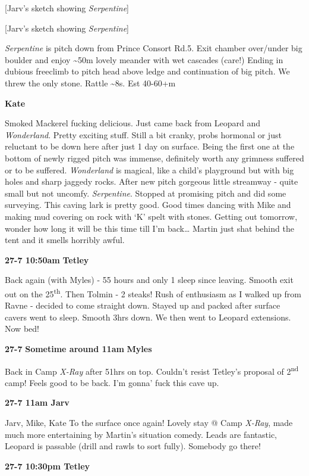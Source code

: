 {[}Jarv's sketch showing \emph{Serpentine}{]}

{[}Jarv's sketch showing \emph{Serpentine}{]}

\emph{Serpentine} is pitch down from Prince Consort Rd.5. Exit chamber
over/under big boulder and enjoy \textasciitilde{}50m lovely meander
with wet cascades (care!) Ending in dubious freeclimb to pitch head
above ledge and continuation of big pitch. We threw the only stone.
Rattle \textasciitilde{}8s. Est 40-60+m

\textbf{Kate}

Smoked Mackerel fucking delicious. Just came back from Leopard and
\emph{Wonderland}. Pretty exciting stuff. Still a bit cranky, probs
hormonal or just reluctant to be down here after just 1 day on surface.
Being the first one at the bottom of newly rigged pitch was immense,
definitely worth any grimness suffered or to be suffered.
\emph{Wonderland} is magical, like a child's playground but with big
holes and sharp jaggedy rocks. After new pitch gorgeous little streamway
- quite small but not uncomfy. \emph{Serpentine}. Stopped at promising
pitch and did some surveying. This caving lark is pretty good. Good
times dancing with Mike and making mud covering on rock with `K' spelt
with stones. Getting out tomorrow, wonder how long it will be this time
till I'm back\ldots{} Martin just shat behind the tent and it smells
horribly awful.

\textbf{27-7 10:50am} \textbf{Tetley}

Back again (with Myles) - 55 hours and only 1 sleep since leaving.
Smooth exit out on the 25\textsuperscript{th}. Then Tolmin - 2 steaks!
Rush of enthusiasm as I walked up from Ravne - decided to come straight
down. Stayed up and packed after surface cavers went to sleep. Smooth
3hrs down. We then went to Leopard extensions. Now bed!

\textbf{27-7} \textbf{Sometime around 11am} \textbf{Myles}

Back in Camp \emph{X-Ray} after 51hrs on top. Couldn't resist Tetley's
proposal of 2\textsuperscript{nd} camp! Feels good to be back. I'm
gonna' fuck this cave up.

\textbf{27-7 11am Jarv}

Jarv, Mike, Kate To the surface once again! Lovely stay @ Camp
\emph{X-Ray}, made much more entertaining by Martin's situation comedy.
Leads are fantastic, Leopard is passable (drill and rawls to sort
fully). Somebody go there!

\textbf{27-7 10:30pm Tetley}

